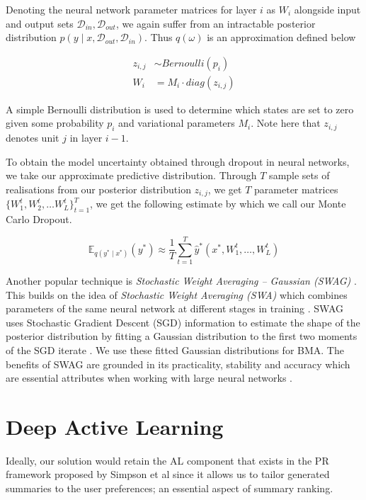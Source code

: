 \documentclass[ %
                    author={James Stephenson},
                supervisor={Dr. Edwin Simpson},
                    degree={MSc},
                     title={Project Plan: Bayesian Deep Learning For Extractive Test Summarisation},
                  subtitle={},
                      type={},
                      year={2022}]{../additions/dissertation}
\begin{document}
			\medbreak
			Denoting the neural network parameter matrices for layer $i$ as $W_i$ alongside input and output sets $\mathcal{D}_{in}, \mathcal{D}_{out}$, we again suffer from an intractable posterior distribution $p(y \mid x, \mathcal{D}_{out}, \mathcal{D}_{in})$. Thus $q(\omega)$ is an approximation defined below
			
			\begin{align*}
				z_{i, j} &\sim Bernoulli(p_i) \\
				W_i &= M_i \cdot diag(z_{i,j})
			\end{align*}
			
			\noindent
			A simple Bernoulli distribution is used to determine which states are set to zero given some probability $p_i$ and variational parameters $M_i$. Note here that $z_{i,j}$ denotes unit $j$ in layer $i-1$.
			
			\medbreak
			To obtain the model uncertainty obtained through dropout in neural networks, we take our approximate predictive distribution. Through $T$ sample sets of realisations from our posterior distribution $z_{i,j}$, we get $T$ parameter matrices $\{W^{t}_{1}, W^{t}_{2}, \ldots W^{t}_{L}\}^{T}_{t=1}$, we get the following estimate by which we call our Monte Carlo Dropout.
			
			$$
				\mathbb{E}_{q(y^\ast \mid x^\ast)}(y^\ast) \approx \frac{1}{T} \sum_{t=1}^{T} \hat{y}^\ast(x^\ast, W_{1}^{t}, \ldots, W_{L}^{t})
			$$
			
			Another popular technique is \emph{Stochastic Weight Averaging – Gaussian (SWAG)} \cite{Maddox19}. This builds on the idea of \emph{Stochastic Weight Averaging (SWA)} which combines parameters of the same neural network at different stages in training \cite{Dmitrii18}. SWAG uses Stochastic Gradient Descent (SGD) information to estimate the shape of the posterior distribution by fitting a Gaussian distribution to the first two moments of the SGD iterate \cite{Maddox19}. We use these fitted Gaussian distributions for BMA. The benefits of SWAG are grounded in its practicality, stability and accuracy which are essential attributes when working with large neural networks \cite{Maddox19}.

			
		\section{Deep Active Learning}
		\label{chap:literaturereview:deepactive}
		
		Ideally, our solution would retain the AL component that exists in the PR framework proposed by Simpson et al \cite{Simpson19} since it allows us to tailor generated summaries to the user preferences; an essential aspect of summary ranking.
		
\end{document}
